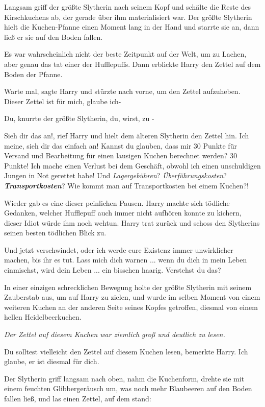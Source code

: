 Langsam griff der größte Slytherin nach seinem Kopf und schälte die Reste des
Kirschkuchens ab, der gerade über ihm materialisiert war. Der größte Slytherin
hielt die Kuchen-Pfanne einen Moment lang in der Hand und starrte sie an, dann
ließ er sie auf den Boden fallen.

Es war wahrscheinlich nicht der beste Zeitpunkt auf der Welt, um zu Lachen, aber
genau das tat einer der Hufflepuffs. Dann erblickte Harry den Zettel auf dem
Boden der Pfanne.

\glqq{}Warte mal\grqq{}, sagte Harry und stürzte nach vorne, um den Zettel
aufzuheben. \glqq{}Dieser Zettel ist für mich, glaube ich-\grqq{}

\glqq{}Du\grqq{}, knurrte der größte Slytherin, \glqq{}du, wirst, zu -\grqq{}

\glqq{}Sieh dir das an!\grqq{}, rief Harry und hielt dem älteren Slytherin den
Zettel hin. \glqq{}Ich meine, sieh dir das einfach an! Kannst du glauben, dass
mir 30 Punkte für Versand und Bearbeitung für einen lausigen Kuchen berechnet
werden? 30 Punkte! Ich mache einen Verlust bei dem Geschäft, obwohl ich einen
unschuldigen Jungen in Not gerettet habe! Und \emph{Lagergebühren}?
\emph{Überführungskosten}? \textbf{\emph{Transportkosten}}? Wie kommt man auf
Transportkosten bei einem Kuchen?!\grqq{}

Wieder gab es eine dieser peinlichen Pausen. Harry machte sich tödliche
Gedanken, welcher Hufflepuff auch immer nicht aufhören konnte zu kichern, dieser
Idiot würde ihm noch wehtun. Harry trat zurück und schoss den Slytherins seinen
besten tödlichen Blick zu.

\glqq{}Und jetzt verschwindet, oder ich werde eure Existenz immer unwirklicher
machen, bis ihr es tut. Lass mich dich warnen ... wenn du dich in mein Leben
einmischst, wird dein Leben ... ein bisschen haarig. Verstehst du das?\grqq{}

In einer einzigen schrecklichen Bewegung holte der größte Slytherin mit seinem
Zauberstab aus, um auf Harry zu zielen, und wurde im selben Moment von einem
weiteren Kuchen an der anderen Seite seines Kopfes getroffen, diesmal von einem
hellen Heidelbeerkuchen.

\emph{Der Zettel auf diesem Kuchen war ziemlich groß und deutlich zu lesen.}

\glqq{}Du solltest vielleicht den Zettel auf diesem Kuchen lesen\grqq{}, bemerkte
Harry. \glqq{}Ich glaube, er ist diesmal für dich.\grqq{}

Der Slytherin griff langsam nach oben, nahm die Kuchenform, drehte sie mit einem
feuchten Glibbergeräusch um, was noch mehr Blaubeeren auf den Boden fallen ließ,
und las einen Zettel, auf dem stand:

